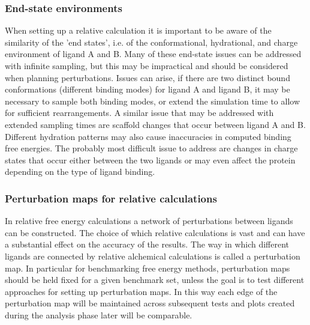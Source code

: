 \documentclass[9pt,bestpractices]{livecoms}
\begin{document}
\subsubsection{End-state environments}
When setting up a relative calculation it is important to be aware of the similarity of the 'end states', i.e. of the conformational, hydrational, and charge environment of ligand A and B. Many of these end-state issues can be addressed with infinite sampling, but this may be impractical and should be considered when planning perturbations. Issues can arise, if there are two distinct bound conformations (different binding modes) for ligand A and ligand B, it may be necessary to sample both binding modes, or extend the simulation time to allow for sufficient rearrangements. A similar issue that may be addressed with extended sampling times are scaffold changes that occur between ligand A and B. Different hydration patterns may also cause inaccuracies in computed binding free energies. The probably most difficult issue to address are changes in charge states that occur either between the two ligands or may even affect the protein depending on the type of ligand binding. 

\subsubsection{Perturbation maps for relative calculations}
In relative free energy calculations a network of perturbations between ligands can be constructed. The choice of which relative calculations is vast and can have a substantial effect on the accuracy of the results. The way in which different ligands are connected by relative alchemical calculations is called a perturbation map. In particular for benchmarking free energy methods, perturbation maps should be held fixed for a given benchmark set, unless the goal is to test different approaches for setting up perturbation maps. In this way each edge of the perturbation map will be maintained across subsequent tests and plots created during the analysis phase later will be comparable. 
\end{document}
